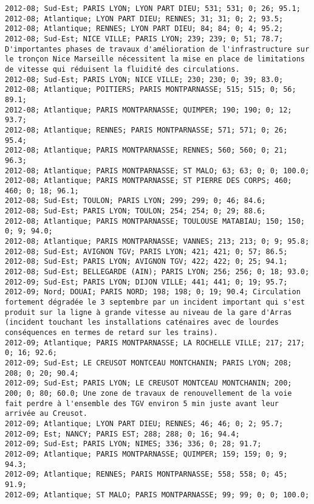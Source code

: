 \documentclass{article}
\begin{document}
\begin{Verbatim}[commandchars=\\\{\}]
2012-08; Sud-Est; PARIS LYON; LYON PART DIEU; 531; 531; 0; 26; 95.1; 
2012-08; Atlantique; LYON PART DIEU; RENNES; 31; 31; 0; 2; 93.5; 
2012-08; Atlantique; RENNES; LYON PART DIEU; 84; 84; 0; 4; 95.2; 
2012-08; Sud-Est; NICE VILLE; PARIS LYON; 239; 239; 0; 51; 78.7; D'importantes phases de travaux d'amélioration de l'infrastructure sur le tronçon Nice Marseille nécessitent la mise en place de limitations de vitesse qui réduisent la fluidité des circulations.
2012-08; Sud-Est; PARIS LYON; NICE VILLE; 230; 230; 0; 39; 83.0; 
2012-08; Atlantique; POITIERS; PARIS MONTPARNASSE; 515; 515; 0; 56; 89.1; 
2012-08; Atlantique; PARIS MONTPARNASSE; QUIMPER; 190; 190; 0; 12; 93.7; 
2012-08; Atlantique; RENNES; PARIS MONTPARNASSE; 571; 571; 0; 26; 95.4; 
2012-08; Atlantique; PARIS MONTPARNASSE; RENNES; 560; 560; 0; 21; 96.3; 
2012-08; Atlantique; PARIS MONTPARNASSE; ST MALO; 63; 63; 0; 0; 100.0; 
2012-08; Atlantique; PARIS MONTPARNASSE; ST PIERRE DES CORPS; 460; 460; 0; 18; 96.1; 
2012-08; Sud-Est; TOULON; PARIS LYON; 299; 299; 0; 46; 84.6; 
2012-08; Sud-Est; PARIS LYON; TOULON; 254; 254; 0; 29; 88.6; 
2012-08; Atlantique; PARIS MONTPARNASSE; TOULOUSE MATABIAU; 150; 150; 0; 9; 94.0; 
2012-08; Atlantique; PARIS MONTPARNASSE; VANNES; 213; 213; 0; 9; 95.8; 
2012-08; Sud-Est; AVIGNON TGV; PARIS LYON; 421; 421; 0; 57; 86.5; 
2012-08; Sud-Est; PARIS LYON; AVIGNON TGV; 422; 422; 0; 25; 94.1; 
2012-08; Sud-Est; BELLEGARDE (AIN); PARIS LYON; 256; 256; 0; 18; 93.0; 
2012-09; Sud-Est; PARIS LYON; DIJON VILLE; 441; 441; 0; 19; 95.7; 
2012-09; Nord; DOUAI; PARIS NORD; 198; 198; 0; 19; 90.4; Circulation fortement dégradée le 3 septembre par un incident important qui s'est produit sur la ligne à grande vitesse au niveau de la gare d'Arras (incident touchant les installations caténaires avec de lourdes conséquences en termes de retard sur les trains).
2012-09; Atlantique; PARIS MONTPARNASSE; LA ROCHELLE VILLE; 217; 217; 0; 16; 92.6; 
2012-09; Sud-Est; LE CREUSOT MONTCEAU MONTCHANIN; PARIS LYON; 208; 208; 0; 20; 90.4; 
2012-09; Sud-Est; PARIS LYON; LE CREUSOT MONTCEAU MONTCHANIN; 200; 200; 0; 80; 60.0; Une zone de travaux de renouvellement de la voie fait perdre à l'ensemble des TGV environ 5 min juste avant leur arrivée au Creusot.
2012-09; Atlantique; LYON PART DIEU; RENNES; 46; 46; 0; 2; 95.7; 
2012-09; Est; NANCY; PARIS EST; 288; 288; 0; 16; 94.4; 
2012-09; Sud-Est; PARIS LYON; NIMES; 336; 336; 0; 28; 91.7; 
2012-09; Atlantique; PARIS MONTPARNASSE; QUIMPER; 159; 159; 0; 9; 94.3; 
2012-09; Atlantique; RENNES; PARIS MONTPARNASSE; 558; 558; 0; 45; 91.9; 
2012-09; Atlantique; ST MALO; PARIS MONTPARNASSE; 99; 99; 0; 0; 100.0; 

\end{Verbatim}
\end{document}
